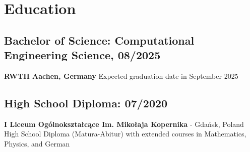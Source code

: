 \section{Education}

\subsection*{Bachelor of Science: Computational Engineering Science, 08/2025}
\textbf{RWTH Aachen, Germany}
Expected graduation date in September 2025

\subsection*{High School Diploma: 07/2020}
\textbf{I Liceum Ogólnokształcące Im. Mikołaja Kopernika} - Gdańsk, Poland
High School Diploma (Matura-Abitur) with extended courses in Mathematics, Physics, and German
